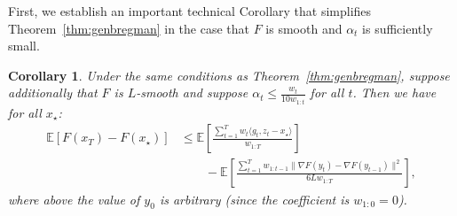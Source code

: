 \documentclass{article}
\newtheorem{corollary}{Corollary}
\begin{document}
First, we establish  an important technical Corollary that simplifies Theorem~\ref{thm:genbregman} in the case that $F$ is smooth and $\alpha_t$ is sufficiently small.
\begin{corollary}\label{cor:negativebregman}
    Under the same conditions as Theorem~\ref{thm:genbregman}, suppose additionally that $F$ is $L$-smooth and suppose $\alpha_t \le \frac{w_t}{10w_{1:t}}$ for all $t$. Then we have for all $x_\star$:
\begin{align*}
    \mathbb{E}[F(x_T) - F(x_\star)]&\le \mathbb{E}\left[\frac{\sum_{t=1}^T w_t\langle g_t, z_t -x_\star\rangle}{w_{1:T}}\right]\\
     &\qquad-\mathbb{E}\left[\frac{\sum_{t=1}^T w_{1:t-1}\|\nabla F(y_t) - \nabla F(y_{t-1})\|^2}{6L w_{1:T}}\right],
\end{align*}
where above the value of $y_0$ is arbitrary (since the coefficient is $w_{1:0}=0$).
\end{corollary}
\end{document}
